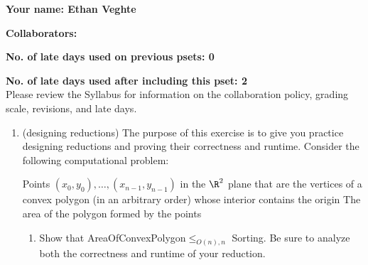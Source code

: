 \documentclass[11pt]{article}
\begin{document}

\textbf{Your name: Ethan Veghte}

\textbf{Collaborators: }

\textbf{No. of late days used on previous psets: 0 }

\textbf{No. of late days used after including this pset: 2}
\\

Please review the Syllabus for information on the collaboration 
policy, grading scale, revisions, and late days.

\begin{enumerate}
     \item  (designing reductions) 
     The purpose of this exercise is to give you practice designing reductions and proving their correctness and runtime.
    Consider the following computational problem:

    {Points $(x_0,y_0),\ldots,(x_{n-1},y_{n-1})$ in the $\R^2$ plane that are the vertices of a convex polygon (in an arbitrary order) whose interior contains the origin}
    {The area of the polygon formed by the points}


    \begin{enumerate}
        \item \label{part:polar} 
        Show that AreaOfConvexPolygon$\leq_{O(n),n}$ Sorting.  Be sure to analyze both the correctness and runtime of your reduction.


\end{enumerate}
\end{enumerate}
\end{document}
